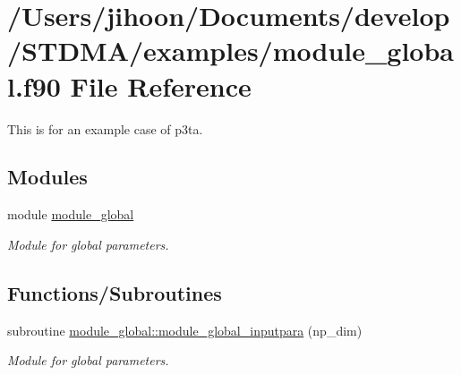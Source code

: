 \hypertarget{module__global_8f90}{}\section{/\+Users/jihoon/\+Documents/develop/\+S\+T\+D\+M\+A/examples/module\+\_\+global.f90 File Reference}
\label{module__global_8f90}


This is for an example case of p3ta.  


\subsection*{Modules}
\begin{DoxyCompactItemize}
\item 
module \mbox{\hyperlink{namespacemodule__global}{module\+\_\+global}}
\begin{DoxyCompactList}\small\item\em Module for global parameters. \end{DoxyCompactList}\end{DoxyCompactItemize}
\subsection*{Functions/\+Subroutines}
\begin{DoxyCompactItemize}
\item 
subroutine \mbox{\hyperlink{namespacemodule__global_a74cb46a87131e7b91b464cd2a2c480d2}{module\+\_\+global\+::module\+\_\+global\+\_\+inputpara}} (np\+\_\+dim)
\begin{DoxyCompactList}\small\item\em Module for global parameters. \end{DoxyCompactList}\end{DoxyCompactItemize}
